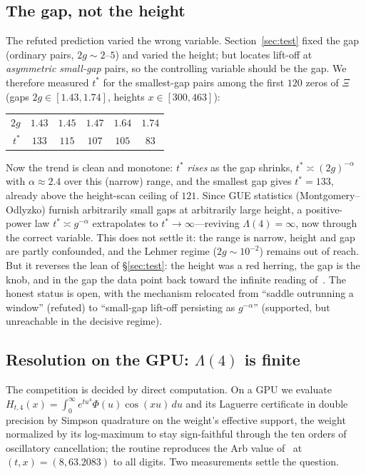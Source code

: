 \documentclass[11pt,reqno]{amsart}
\theoremstyle{plain}
\theoremstyle{definition}
\theoremstyle{remark}
\begin{document}
\subsection{The gap, not the height}\label{sec:gaptest}
The refuted prediction varied the wrong variable. Section~\ref{sec:test}
fixed the gap (ordinary pairs, $2g\sim2$--$5$) and varied the height; but
\cite{FontesRMT} locates lift-off at \emph{asymmetric small-gap} pairs,
so the controlling variable should be the gap. We therefore measured
$t^\ast$ for the smallest-gap pairs among the first $120$ zeros of $\Xi$
(gaps $2g\in[1.43,1.74]$, heights $x\in[300,463]$):
\begin{center}
\begin{tabular}{r|ccccc}
\hline
$2g$ & $1.43$ & $1.45$ & $1.47$ & $1.64$ & $1.74$\\
$t^\ast$ & $133$ & $115$ & $107$ & $105$ & $83$\\
\hline
\end{tabular}
\end{center}
Now the trend is clean and monotone: $t^\ast$ \emph{rises} as the gap
shrinks, $t^\ast\asymp(2g)^{-\alpha}$ with $\alpha\approx2.4$ over this
(narrow) range, and the smallest gap gives $t^\ast=133$, already above the
height-scan ceiling of $121$. Since GUE statistics
(Montgomery--Odlyzko) furnish arbitrarily small gaps at arbitrarily large
height, a positive-power law $t^\ast\asymp g^{-\alpha}$ extrapolates to
$t^\ast\to\infty$---reviving $\Lambda(4)=\infty$, now through the correct
variable. This does not settle it: the range is narrow, height and gap are
partly confounded, and the Lehmer regime ($2g\sim10^{-2}$) remains out of
reach. But it reverses the lean of \S\ref{sec:test}: the height was a red
herring, the gap is the knob, and in the gap the data point back toward
the infinite reading of~\cite{FontesRMT}. The honest status is open, with the
mechanism relocated from ``saddle outrunning a window'' (refuted) to
``small-gap lift-off persisting as $g^{-\alpha}$'' (supported, but
unreachable in the decisive regime).

\subsection{Resolution on the GPU: $\Lambda(4)$ is finite}\label{sec:gpu}
The competition is decided by direct computation. On a GPU we evaluate
$H_{t,4}(x)=\int_0^\infty e^{tu^4}\Phi(u)\cos(xu)\,du$ and its Laguerre
certificate in double precision by Simpson quadrature on the weight's
effective support, the weight normalized by its log-maximum to stay
sign-faithful through the ten orders of oscillatory cancellation; the
routine reproduces the Arb value of~\cite{FontesIBM} at
$(t,x)=(8,63.2083)$ to all digits. Two measurements settle the question.
\end{document}
